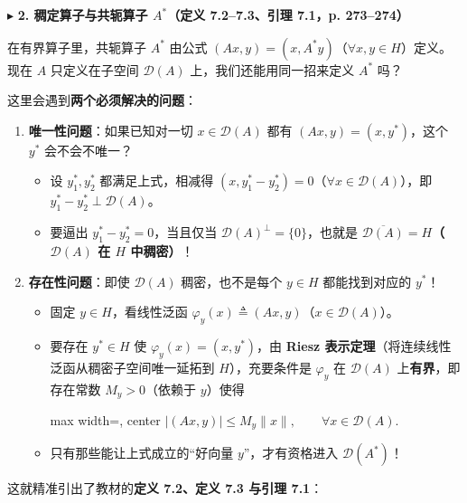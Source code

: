 \documentclass[11pt,a4paper]{article}
\providecommand{\tightlist}{\setlength{\itemsep}{1.8pt}\setlength{\parskip}{0pt}}
\newcommand{\SubSubHeading}[1]{%
  \Needspace{6.5\baselineskip}\vspace{5.5pt}\noindent
  \textcolor{AccentMain}{\scriptsize$\blacktriangleright$}\hspace{4pt}%
  {\small\bfseries\color{AccentMain}#1}\par\nopagebreak[4]\vspace{2.5pt}%
}
\newcommand{\FitDisplayMath}[1]{%
  \par\vspace{4pt}\noindent
  \begin{adjustbox}{max width=\linewidth, center}
    $\displaystyle #1$
  \end{adjustbox}
  \par\vspace{4pt}%
}
\begin{document}
\SubSubHeading{2. 稠定算子与共轭算子 \(A^*\)（定义 7.2--7.3、引理 7.1，p. 273--274）}

在有界算子里，共轭算子 \(A^*\) 由公式 \((Ax, y) = (x, A^*y)\)（\(\forall x, y \in H\)）定义。现在 \(A\) 只定义在子空间 \(\mathcal{D}(A)\) 上，我们还能用同一招来定义 \(A^*\) 吗？

这里会遇到\textbf{两个必须解决的问题}：

\begin{enumerate}
\def\labelenumi{\arabic{enumi}.}
\tightlist
\item
  \textbf{唯一性问题}：如果已知对一切 \(x \in \mathcal{D}(A)\) 都有 \((Ax, y) = (x, y^*)\)，这个 \(y^*\) 会不会不唯一？

  \begin{itemize}
  \tightlist
  \item
    设 \(y_1^*, y_2^*\) 都满足上式，相减得 \((x, y_1^* - y_2^*) = 0\)（\(\forall x \in \mathcal{D}(A)\)），即 \(y_1^* - y_2^* \perp \mathcal{D}(A)\)。
  \item
    要逼出 \(y_1^* - y_2^* = 0\)，当且仅当 \(\mathcal{D}(A)^\perp = \{0\}\)，也就是 \textbf{\(\overline{\mathcal{D}(A)} = H\)（\(\mathcal{D}(A)\) 在 \(H\) 中稠密）}！
  \end{itemize}
\item
  \textbf{存在性问题}：即使 \(\mathcal{D}(A)\) 稠密，也不是每个 \(y \in H\) 都能找到对应的 \(y^*\)！

  \begin{itemize}
  \tightlist
  \item
    固定 \(y \in H\)，看线性泛函 \(\varphi_y(x) \triangleq (Ax, y)\)（\(x \in \mathcal{D}(A)\)）。
  \item
    要存在 \(y^* \in H\) 使 \(\varphi_y(x) = (x, y^*)\)，由 \textbf{Riesz 表示定理}（将连续线性泛函从稠密子空间唯一延拓到 \(H\)），充要条件是 \(\varphi_y\) 在 \(\mathcal{D}(A)\) 上\textbf{有界}，即存在常数 \(M_y > 0\)（依赖于 \(y\)）使得 
\FitDisplayMath{|(Ax, y)| \le M_y \|x\|, \qquad \forall x \in \mathcal{D}(A).}

  \item
    只有那些能让上式成立的``好向量 \(y\)''，才有资格进入 \(\mathcal{D}(A^*)\)！
  \end{itemize}
\end{enumerate}

这就精准引出了教材的\textbf{定义 7.2、定义 7.3 与引理 7.1}：
\end{document}
